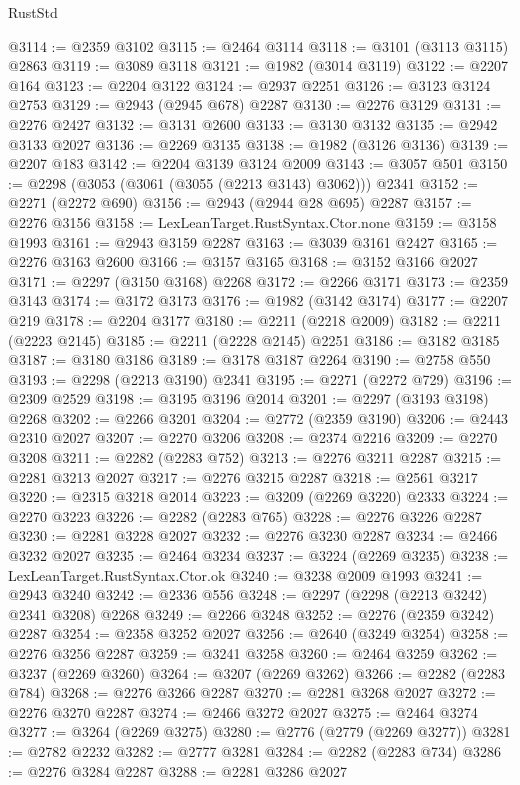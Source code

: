 \begin{lexlean}{RustStd}
\begin{coremodule}
@3114 := @2359 @3102
@3115 := @2464 @3114
@3118 := @3101 (@3113 @3115) @2863
@3119 := @3089 @3118
@3121 := @1982 (@3014 @3119)
@3122 := @2207 @164
@3123 := @2204 @3122
@3124 := @2937 @2251
@3126 := @3123 @3124 @2753
@3129 := @2943 (@2945 @678) @2287
@3130 := @2276 @3129
@3131 := @2276 @2427
@3132 := @3131 @2600
@3133 := @3130 @3132
@3135 := @2942 @3133 @2027
@3136 := @2269 @3135
@3138 := @1982 (@3126 @3136)
@3139 := @2207 @183
@3142 := @2204 @3139 @3124 @2009
@3143 := @3057 @501
@3150 := @2298 (@3053 (@3061 (@3055 (@2213 @3143) @3062))) @2341
@3152 := @2271 (@2272 @690)
@3156 := @2943 (@2944 @28 @695) @2287
@3157 := @2276 @3156
@3158 := LexLeanTarget.RustSyntax.Ctor.none
@3159 := @3158 @1993
@3161 := @2943 @3159 @2287
@3163 := @3039 @3161 @2427
@3165 := @2276 @3163 @2600
@3166 := @3157 @3165
@3168 := @3152 @3166 @2027
@3171 := @2297 (@3150 @3168) @2268
@3172 := @2266 @3171
@3173 := @2359 @3143
@3174 := @3172 @3173
@3176 := @1982 (@3142 @3174)
@3177 := @2207 @219
@3178 := @2204 @3177
@3180 := @2211 (@2218 @2009)
@3182 := @2211 (@2223 @2145)
@3185 := @2211 (@2228 @2145) @2251
@3186 := @3182 @3185
@3187 := @3180 @3186
@3189 := @3178 @3187 @2264
@3190 := @2758 @550
@3193 := @2298 (@2213 @3190) @2341
@3195 := @2271 (@2272 @729)
@3196 := @2309 @2529
@3198 := @3195 @3196 @2014
@3201 := @2297 (@3193 @3198) @2268
@3202 := @2266 @3201
@3204 := @2772 (@2359 @3190)
@3206 := @2443 @2310 @2027
@3207 := @2270 @3206
@3208 := @2374 @2216
@3209 := @2270 @3208
@3211 := @2282 (@2283 @752)
@3213 := @2276 @3211 @2287
@3215 := @2281 @3213 @2027
@3217 := @2276 @3215 @2287
@3218 := @2561 @3217
@3220 := @2315 @3218 @2014
@3223 := @3209 (@2269 @3220) @2333
@3224 := @2270 @3223
@3226 := @2282 (@2283 @765)
@3228 := @2276 @3226 @2287
@3230 := @2281 @3228 @2027
@3232 := @2276 @3230 @2287
@3234 := @2466 @3232 @2027
@3235 := @2464 @3234
@3237 := @3224 (@2269 @3235)
@3238 := LexLeanTarget.RustSyntax.Ctor.ok
@3240 := @3238 @2009 @1993
@3241 := @2943 @3240
@3242 := @2336 @556
@3248 := @2297 (@2298 (@2213 @3242) @2341 @3208) @2268
@3249 := @2266 @3248
@3252 := @2276 (@2359 @3242) @2287
@3254 := @2358 @3252 @2027
@3256 := @2640 (@3249 @3254)
@3258 := @2276 @3256 @2287
@3259 := @3241 @3258
@3260 := @2464 @3259
@3262 := @3237 (@2269 @3260)
@3264 := @3207 (@2269 @3262)
@3266 := @2282 (@2283 @784)
@3268 := @2276 @3266 @2287
@3270 := @2281 @3268 @2027
@3272 := @2276 @3270 @2287
@3274 := @2466 @3272 @2027
@3275 := @2464 @3274
@3277 := @3264 (@2269 @3275)
@3280 := @2776 (@2779 (@2269 @3277))
@3281 := @2782 @2232
@3282 := @2777 @3281
@3284 := @2282 (@2283 @734)
@3286 := @2276 @3284 @2287
@3288 := @2281 @3286 @2027

\end{coremodule}
\end{lexlean}
